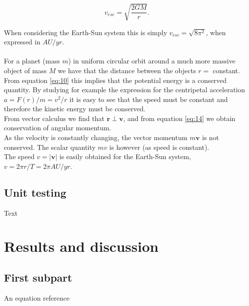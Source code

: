 \documentclass[%
 reprint,
 nobalance,
 amsmath,amssymb,
 aps,
]{revtex4-1}
\begin{document}
\begin{equation}
	v_{esc} = \sqrt{\frac{2GM}{r}}.
\end{equation}

When considering the Earth-Sun system this is simply $v_{esc} = \sqrt{8\pi^{2}}$, when expressed in $AU/yr$. \\ \\
For a planet (mass $m$) in uniform circular orbit around a much more massive object of mass $M$ we have that the distance between the objects $r = $ constant. From equation \eqref{eq:10} this implies that the potential energy is a conserved quantity. By studying for example the expression for the centripetal acceleration $a = F(r)/m = v^{2}/r$ it is easy to see that the speed must be constant and therefore the kinetic energy must be conserved.\\
From vector calculus we find that $\bm{r} \perp \bm{v}$, and from equation \eqref{eq:14} we obtain conservation of angular momentum.\\
As the velocity is constantly changing, the vector momentum $m\bm{v}$ is not conserved. The scalar quantity $mv$ is however (as speed is constant).\\
The speed $v = \left|\bm{v} \right|$ is easily obtained for the Earth-Sun system, $v = 2\pi r/T = 2\pi AU/yr$.

\subsection{\label{sec:Uni}Unit testing}
Text



\section{Results and discussion}

\subsection{\label{sec:Sub1}First subpart}
An equation reference %

\end{document}
